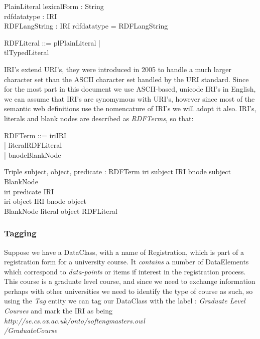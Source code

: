 \documentclass[a4paper,twoside]{article}
\begin{document}
\begin{schema}{PlainLiteral}
	lexicalForm : String \\
	rdfdatatype : IRI  \\
	RDFLangString : IRI
	\where
	rdfdatatype = RDFLangString
\end{schema}

\begin{zed}
	RDFLiteral ::=  pl\ldata PlainLiteral \rdata | \\ tl\ldata TypedLiteral \rdata
\end{zed}
IRI's extend URI's, they were introduced in 2005 to handle a much larger character set than the ASCII character set handled by the URI standard. Since for the most part in this document we use ASCII-based, unicode IRI's in English, we can assume that IRI's are synomymous with URI's, however since most of the semantic web definitions use the nomencature of IRI's we will adopt it also. IRI's, literals and blank nodes are described as \emph{RDFTerms}, so that:

\begin{zed}
	RDFTerm ::= iri\ldata IRI \rdata \\
	| literal\ldata RDFLiteral \rdata \\
	| bnode\ldata BlankNode \rdata 
\end{zed}

\begin{schema}{Triple}
	subject, object, predicate : RDFTerm
	\where
	iri \inv subject \in IRI \lor bnode \inv subject \in \\ BlankNode \\
	iri \inv predicate \in IRI \\
	iri \inv object \in IRI \lor bnode \inv object \in \\ BlankNode \lor literal \inv object \in RDFLiteral\\
\end{schema}


\subsubsection{Tagging}

Suppose we have a DataClass, with a name of Registration, which is part of a registration form for a university course.  It \emph{contains} a number of DataElements which correspond to \emph{data-points} or items if interest in the registration process. This course is a graduate level course, and since we need to exchange information perhaps with other universities we need to identify the type of course as such, so using the \emph{Tag} entity we can tag our DataClass with the label : \emph{Graduate Level Courses} and mark the IRI as being \emph{http://se.cs.ox.ac.uk/onto/softengmasters.owl\ \\ /GraduateCourse}
\end{document}
